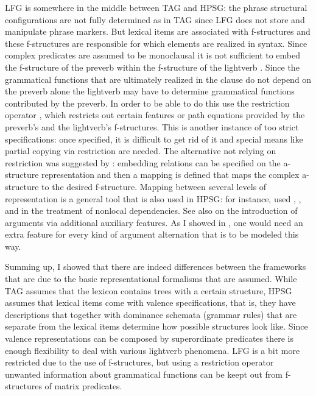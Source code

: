 LFG is somewhere in the middle between TAG and HPSG: the phrase structural configurations are not
fully determined as in TAG since LFG does not store and manipulate phrase markers. But lexical items are
associated with f-structures and these f-structures are responsible for which elements are realized
in syntax. Since complex predicates are assumed to be monoclausal it is not sufficient to embed the
f-structure of the preverb within the f-structure of the lightverb \citep{BHKM2003a-u}. Since the grammatical functions
that are ultimately realized in the clause do not depend on the preverb alone the lightverb may have
to determine grammatical functions contributed by the preverb. In order to be able to do this \citet{BHKM2003a-u}
use the restriction operator \citep{KW93a-u}, which restricts out certain features or path equations provided by the
preverb's and the lightverb's f-structures. This is another instance of too strict specifications:
once specified, it is difficult to get rid of it and special means like partial copying via
restriction are needed. The alternative not relying on restriction was suggested by \citet{Butt97a}:
embedding relations can be specified on the a-structure representation and then a mapping is defined
that maps the complex a-structure to the desired f-structure. Mapping between several levels of
representation is a general tool that is also used in HPSG: for instance, \citet*{BMS2001a} used
\argst, \deps, and \comps in the treatment of nonlocal dependencies. See also \citet{Koenig99a} on
the introduction of arguments via additional auxiliary features. As I showed in
\citet[Section~7.5.2.2]{MuellerLehrbuch1}, one would need an extra feature for every kind of argument alternation
that is to be modeled this way.


Summing up, I showed that there are indeed differences between the frameworks that are due to the
basic representational formalisms that are assumed. While TAG assumes that the lexicon contains
trees with a certain structure, HPSG assumes that lexical items come with valence specifications,
that is, they have descriptions that together with dominance schemata (grammar rules) that are
separate from the lexical items determine how possible structures look like. Since valence
representations can be composed by superordinate predicates there is enough flexibility to deal with
various lightverb phenomena. LFG is a bit more restricted due to the use of f-structures, but using
a restriction operator unwanted information about grammatical functions can be keept out from
f-structures of matrix predicates.
